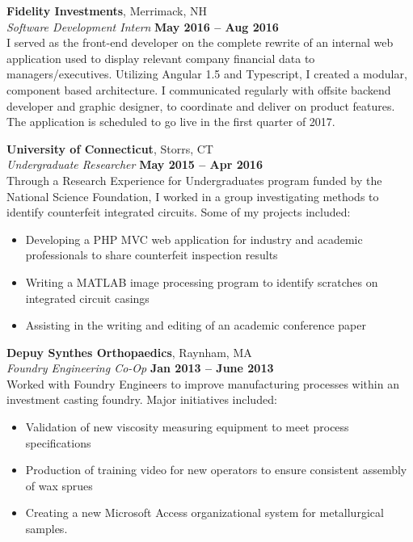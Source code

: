 \documentclass[margin,line]{resume}
\begin{document}
\begin{resume}
    \textbf{Fidelity Investments}, Merrimack, NH \vspace{2mm}\\\vspace{1mm}%
    \textsl{Software Development Intern} \hfill \textbf{May 2016 -- Aug 2016}\\
   I served as the front-end developer on the complete rewrite of an internal web application used to display relevant company financial data to managers/executives. Utilizing Angular 1.5 and Typescript, I created a modular, component based architecture. I communicated regularly with offsite backend developer and graphic designer, to coordinate and deliver on product features. The application is scheduled to go live in the first quarter of 2017.

    \textbf{University of Connecticut}, Storrs, CT \vspace{2mm}\\\vspace{1mm}%
    \textsl{Undergraduate Researcher} \hfill \textbf{May 2015 -- Apr 2016}\\
    Through a Research Experience for Undergraduates program funded by the National Science Foundation, I worked in a group investigating methods to identify counterfeit integrated circuits. Some of my projects included:
    \begin{itemize}
     \item Developing a PHP MVC web application for industry and academic professionals to share counterfeit inspection results
     \item Writing a MATLAB image processing program  to identify scratches on integrated circuit casings
     \item Assisting in the writing and editing of an academic conference paper
    \end{itemize}

    \textbf{Depuy Synthes Orthopaedics}, Raynham, MA \vspace{2mm}\\\vspace{1mm}%
    \textsl{Foundry Engineering Co-Op} \hfill \textbf{Jan 2013 -- June 2013}\\
    Worked with Foundry Engineers to improve manufacturing processes within an investment casting foundry. Major initiatives included:
    \begin{itemize}
        \item  Validation of new viscosity measuring equipment to meet process specifications
        \item Production of training video for new operators to ensure consistent assembly of wax sprues
        \item Creating a new Microsoft Access organizational system for metallurgical samples.
    \end{itemize}



\end{resume}
\end{document}
